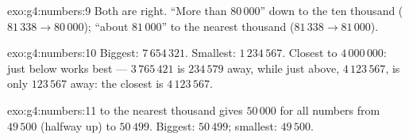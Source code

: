 \begin{solution}{exo:g4:numbers:9}
Both are right. ``More than $80\,000$''  down to the ten
thousand ($81\,338 \to 80\,000$); ``about $81\,000$''  to the
nearest thousand ($81\,338 \to 81\,000$).
\end{solution}

\begin{solution}{exo:g4:numbers:10}
Biggest: $7\,654\,321$. Smallest: $1\,234\,567$. Closest to
$4\,000\,000$: just below works best --- $3\,765\,421$ is
$234\,579$ away, while just above, $4\,123\,567$, is only
$123\,567$ away: the closest is $4\,123\,567$.
\end{solution}

\begin{solution}{exo:g4:numbers:11}
 to the nearest thousand gives $50\,000$ for all numbers
from $49\,500$ (halfway  up) to $50\,499$. Biggest:
$50\,499$; smallest: $49\,500$.
\end{solution}
